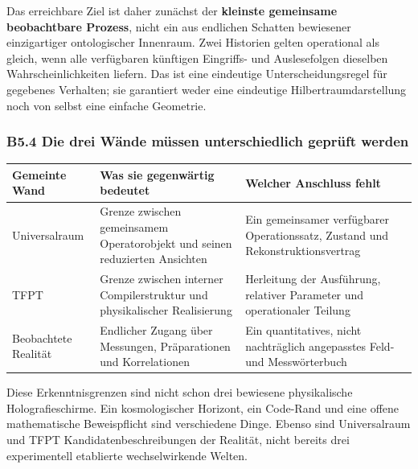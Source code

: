 Das erreichbare Ziel ist daher zunächst der \textbf{kleinste gemeinsame
beobachtbare Prozess}, nicht ein aus endlichen Schatten bewiesener
einzigartiger ontologischer Innenraum. Zwei Historien gelten operational
als gleich, wenn alle verfügbaren künftigen Eingriffs- und Auslesefolgen
dieselben Wahrscheinlichkeiten liefern. Das ist eine eindeutige
Unterscheidungsregel für gegebenes Verhalten; sie garantiert weder eine
eindeutige Hilbertraumdarstellung noch von selbst eine einfache
Geometrie.

\subsubsection{B5.4 Die drei Wände müssen unterschiedlich geprüft
werden}\label{b5.4-die-drei-wuxe4nde-muxfcssen-unterschiedlich-gepruxfcft-werden}

{\def\LTcaptype{none} %
\begin{longtable}[]{@{}
  >{\raggedright\arraybackslash}p{}
  >{\raggedright\arraybackslash}p{}
  >{\raggedright\arraybackslash}p{}@{}}
\toprule\noalign{}
\begin{minipage}[b]{\linewidth}\raggedright
Gemeinte Wand
\end{minipage} & \begin{minipage}[b]{\linewidth}\raggedright
Was sie gegenwärtig bedeutet
\end{minipage} & \begin{minipage}[b]{\linewidth}\raggedright
Welcher Anschluss fehlt
\end{minipage} \\
\midrule\noalign{}
\endhead
\bottomrule\noalign{}
\endlastfoot
Universalraum & Grenze zwischen gemeinsamem Operatorobjekt und seinen
reduzierten Ansichten & Ein gemeinsamer verfügbarer Operationssatz,
Zustand und Rekonstruktionsvertrag \\
TFPT & Grenze zwischen interner Compilerstruktur und physikalischer
Realisierung & Herleitung der Ausführung, relativer Parameter und
operationaler Teilung \\
Beobachtete Realität & Endlicher Zugang über Messungen, Präparationen
und Korrelationen & Ein quantitatives, nicht nachträglich angepasstes
Feld- und Messwörterbuch \\
\end{longtable}
}

Diese Erkenntnisgrenzen sind nicht schon drei bewiesene physikalische
Holografieschirme. Ein kosmologischer Horizont, ein Code-Rand und eine
offene mathematische Beweispflicht sind verschiedene Dinge. Ebenso sind
Universalraum und TFPT Kandidatenbeschreibungen der Realität, nicht
bereits drei experimentell etablierte wechselwirkende Welten.

